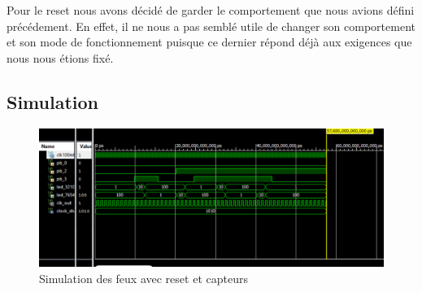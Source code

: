 \documentclass[11pt]{report}
\begin{document}
  Pour le reset nous avons décidé de garder le comportement que nous avions défini précédement. En effet, il ne nous a pas semblé utile de changer son comportement et son mode de fonctionnement puisque ce dernier répond déjà aux exigences que nous nous étions fixé.

  \subsection{Simulation}
\begin{figure}
  \includegraphics[width=13cm]{TP03-4.png}
  	\caption{Simulation des feux avec reset et capteurs}
\end{figure}
\end{document}
